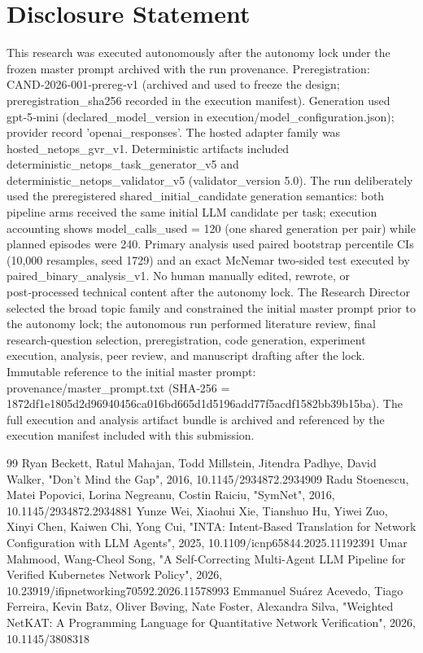 \documentclass[conference]{IEEEtran}
\begin{document}
\section*{Disclosure Statement}
This research was executed autonomously after the autonomy lock under the frozen master prompt archived with the run provenance. Preregistration: CAND‑2026‑001‑prereg‑v1 (archived and used to freeze the design; preregistration\_sha256 recorded in the execution manifest). Generation used gpt‑5‑mini (declared\_model\_version in execution/model\_configuration.json); provider record 'openai\_responses'. The hosted adapter family was hosted\_netops\_gvr\_v1. Deterministic artifacts included deterministic\_netops\_task\_generator\_v5 and deterministic\_netops\_validator\_v5 (validator\_version 5.0). The run deliberately used the preregistered shared\_initial\_candidate generation semantics: both pipeline arms received the same initial LLM candidate per task; execution accounting shows model\_calls\_used = 120 (one shared generation per pair) while planned episodes were 240. Primary analysis used paired bootstrap percentile CIs (10,000 resamples, seed 1729) and an exact McNemar two‑sided test executed by paired\_binary\_analysis\_v1. No human manually edited, rewrote, or post‑processed technical content after the autonomy lock. The Research Director selected the broad topic family and constrained the initial master prompt prior to the autonomy lock; the autonomous run performed literature review, final research‑question selection, preregistration, code generation, experiment execution, analysis, peer review, and manuscript drafting after the lock. Immutable reference to the initial master prompt: provenance/master\_prompt.txt (SHA‑256 = 1872df1e1805d2d96940456ca016bd665d1d5196add77f5acdf1582bb39b15ba). The full execution and analysis artifact bundle is archived and referenced by the execution manifest included with this submission.

\begin{thebibliography}{99}
 Ryan Beckett, Ratul Mahajan, Todd Millstein, Jitendra Padhye, David Walker, "Don't Mind the Gap", 2016, 10.1145/2934872.2934909
 Radu Stoenescu, Matei Popovici, Lorina Negreanu, Costin Raiciu, "SymNet", 2016, 10.1145/2934872.2934881
 Yunze Wei, Xiaohui Xie, Tianshuo Hu, Yiwei Zuo, Xinyi Chen, Kaiwen Chi, Yong Cui, "INTA: Intent-Based Translation for Network Configuration with LLM Agents", 2025, 10.1109/icnp65844.2025.11192391
 Umar Mahmood, Wang-Cheol Song, "A Self-Correcting Multi-Agent LLM Pipeline for Verified Kubernetes Network Policy", 2026, 10.23919/ifipnetworking70592.2026.11578993
 Emmanuel Suárez Acevedo, Tiago Ferreira, Kevin Batz, Oliver Bøving, Nate Foster, Alexandra Silva, "Weighted NetKAT: A Programming Language for Quantitative Network Verification", 2026, 10.1145/3808318
\end{thebibliography}
\end{document}
